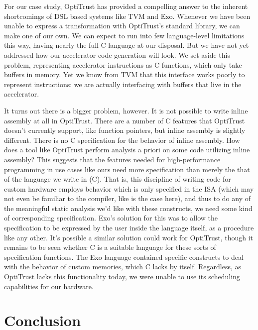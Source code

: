 \documentclass[acmsmall, nonacm=true]{acmart}
\begin{document}
For our case study, OptiTrust has provided a compelling answer to the inherent shortcomings of DSL based systems like TVM and Exo. Whenever we have been unable to express a transformation with OptiTrust's standard library, we can make one of our own. We can expect to run into few language-level limitations this way, having nearly the full C language at our disposal. But we have not yet addressed how our accelerator code generation will look. We set aside this problem, representing accelerator instructions as C functions, which only take buffers in memory. Yet we know from TVM that this interface works poorly to represent instructions: we are actually interfacing with buffers that live in the accelerator. 

It turns out there is a bigger problem, however. It is not possible to write inline assembly at all in OptiTrust. There are a number of C features that OptiTrust doesn't currently support, like function pointers, but inline assembly is slightly different. There is no C specification for the behavior of inline assembly. How does a tool like OptiTrust perform analysis a priori on some code utilizing inline assembly? This suggests that the features needed for high-performance programming in use cases like ours need more specification than merely the that of the language we write in (C). That is, this discipline of writing code for custom hardware employs behavior which is only specified in the ISA (which may not even be familiar to the compiler, like is the case here), and thus to do any of the meaningful static analysis we'd like with these constructs, we need some kind of corresponding specification. Exo's solution for this was to allow the specification to be expressed by the user inside the language itself, as a procedure like any other. It's possible a similar solution could work for OptiTrust, though it remains to be seen whether C is a suitable language for these sorts of specification functions. The Exo language contained specific constructs to deal with the behavior of custom memories, which C lacks by itself.  Regardless, as OptiTrust lacks this functionality today, we were unable to use its scheduling capabilities for our hardware.

\section{Conclusion}
\end{document}
